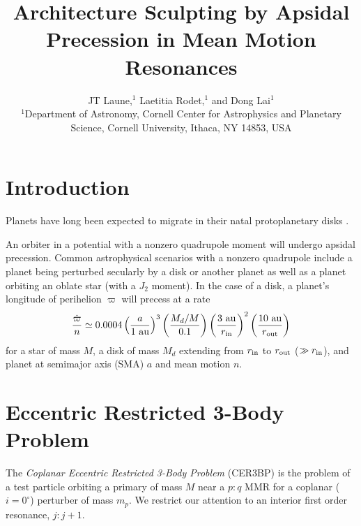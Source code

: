 \documentclass[usenatbib,twocolumn]{mnras}
\title[Apsidal Precession in MMR]{Architecture Sculpting by Apsidal Precession in Mean Motion Resonances}
\author[Laune et al.]{ JT Laune,$^{1}$ Laetitia Rodet,$^{1}$ and Dong
  Lai$^{1}$
  \\
  $^{1}$Department of Astronomy, Cornell Center for Astrophysics and
  Planetary Science, Cornell University, Ithaca, NY 14853, USA \\}
\begin{document}
\maketitle

\section{Introduction}
    Planets have long been expected to migrate in their natal protoplanetary disks \citep[PPDs; e.g.][]{nelson00_migrat_growt_protop_protos_discs}.

    An orbiter in a potential with a nonzero quadrupole moment will undergo apsidal precession. 
    Common astrophysical scenarios with a nonzero quadrupole include a planet being perturbed secularly by a disk or another planet as well as a planet orbiting an oblate star (with a $J_2$ moment). 
    In the case of a disk, a planet's longitude of perihelion $\varpi$ will precess at a rate
    \begin{equation}\label{eq:diskprecscaling}
        \frac{\dot\varpi}{n} \simeq 0.0004\left(\frac{a}{1~\rm{au}}\right)^3\left(\frac{M_d/M}{0.1}\right)\left(\frac{3~\rm{au}}{r_{\rm in}}\right)^2\left(\frac{10~\rm{au}}{r_{\rm out}}\right)
    \end{equation}
    for a star of mass $M$, a disk of mass $M_d$ extending from $r_{\rm in}$ to $r_{\rm out}$ ($\gg r_{\rm in}$), and planet at semimajor axis (SMA) $a$ and mean motion $n$.


\section{Eccentric Restricted 3-Body Problem}
\label{sec:CER3BP}
The \emph{Coplanar Eccentric Restricted 3-Body Problem} (CER3BP) is the problem of a test particle orbiting a primary of mass $M$ near a $p:q$ MMR for a coplanar ($i=0^\circ$) perturber of mass $m_p$.
We restrict our attention to an interior first order resonance, $j:j+1$.
\end{document}
